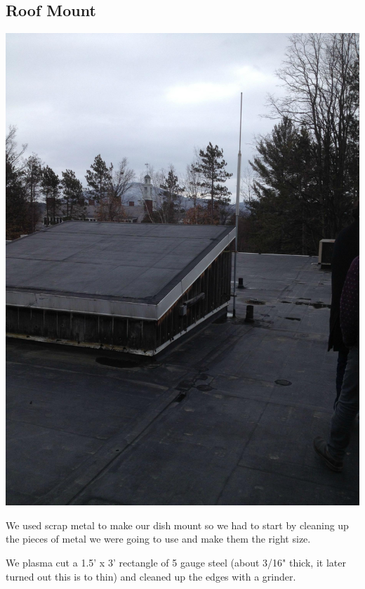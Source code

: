 \documentclass[11pt]{article} %
\begin{document}

\subsection{Roof Mount}

\begin{center}
\includegraphics[scale=0.12]{roofmount/00.jpeg}
\end{center}

We used scrap metal to make our dish mount so we had to start by cleaning up the pieces of metal we were going to use and make them the right size.

We plasma cut a 1.5' x 3' rectangle of 5 gauge steel (about 3/16" thick, it later turned out this is to thin) and cleaned up the edges with a grinder.
\end{document}
